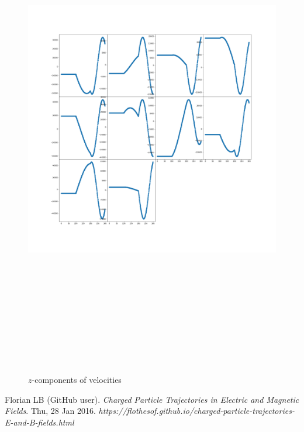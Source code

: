 \documentclass[12pt]{article}
\begin{document}
	\begin{figure}[H]
		\includegraphics[width=\linewidth, height=22cm]{subvsz3.png} \caption{$z$-components of velocities} \label{subvsz3}
	\end{figure}
	

\begin{thebibliography}{}
	 Florian LB (GitHub user). \textit{Charged Particle Trajectories in Electric and Magnetic Fields}. Thu, 28 Jan 2016. \textit{https://flothesof.github.io/charged-particle-trajectories-E-and-B-fields.html}
\end{thebibliography}
\end{document}
